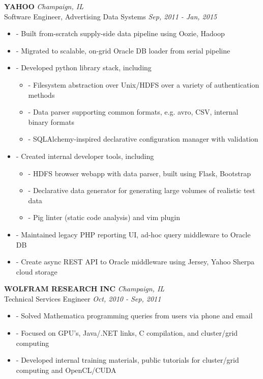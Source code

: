 \documentclass[a4paper,11pt]{article}
\newenvironment{pitemize}{
\begin{itemize}
\setlength{\itemsep}{.01in}
\setlength{\parskip}{.01in}
}
{\end{itemize}}
\begin{document}
\vspace{0.2in}
\textbf{YAHOO} \hfill \textit{Champaign, IL} \\
Software Engineer, Advertising Data Systems \hfill \textit{Sep, 2011 - Jan, 2015}
\begin{pitemize}
    \item[-]Built from-scratch supply-side data pipeline using Oozie, Hadoop
    \item[-]Migrated to scalable, on-grid Oracle DB loader from serial pipeline
    \item[-]Developed python library stack, including
    \begin{pitemize}
        \item[-]Filesystem abstraction over Unix/HDFS over a variety of authentication methods
        \item[-]Data parser supporting common formats, e.g. avro, CSV, internal binary formats
        \item[-]SQLAlchemy-inspired declarative configuration manager with validation
    \end{pitemize}
    \item[-]Created internal developer tools, including
    \begin{pitemize}
        \item[-]HDFS browser webapp with data parser, built using Flask, Bootstrap
        \item[-]Declarative data generator for generating large volumes of realistic test data
        \item[-]Pig linter (static code analysis) and vim plugin
    \end{pitemize}
    \item[-]Maintained legacy PHP reporting UI, ad-hoc query middleware to Oracle DB
    \item[-]Create async REST API to Oracle middleware using Jersey, Yahoo Sherpa cloud storage
\end{pitemize}

\vspace{0.2in}
\textbf{WOLFRAM RESEARCH INC} \hfill \textit{Champaign, IL} \\
Technical Services Engineer \hfill \textit{Oct, 2010 - Sep, 2011}
\begin{pitemize}
\item[-]Solved Mathematica programming queries from users via phone and email
\item[-]Focused on GPU's, Java/.NET links, C compilation, and cluster/grid computing
\item[-]Developed internal training materials, public tutorials for cluster/grid computing and OpenCL/CUDA
\end{pitemize}
\end{document}
